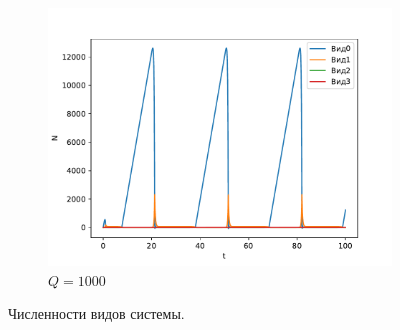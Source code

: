 \begin{figure}[H]
\begin{subfigure}[t]{.3\linewidth}
            \includegraphics[width=\textwidth]{pictures/exp_flow/exp2_Q1000.pdf}
            \caption{\(Q = 1000\)}
        \end{subfigure}
    \caption{Численности видов системы.}  \label{fig:flow_exp2_q3}
    \end{figure}